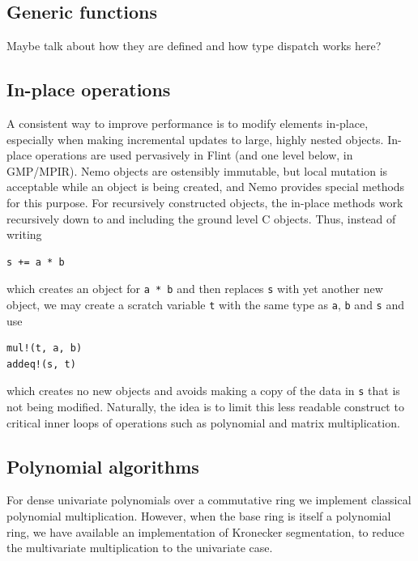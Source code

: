 \documentclass{sig-alternate-05-2015}
\begin{document}
\subsection{Generic functions}

Maybe talk about how they are defined and how type dispatch works here?

\subsection{In-place operations}

A consistent way to improve performance is to modify
elements in-place, especially when making incremental updates
to large, highly nested objects.
In-place operations are used pervasively in Flint (and one level below, in GMP/MPIR).
Nemo objects are ostensibly immutable, but local mutation is
acceptable while an object is being created,
and Nemo provides special methods for this purpose.
For recursively constructed objects, the in-place methods work
recursively down to and including the ground level C objects.
Thus, instead of writing
\begin{verbatim}
s += a * b
\end{verbatim}
which creates an object for \texttt{a * b}
and then replaces \texttt{s} with yet another new object, we may
create a scratch variable \texttt{t} with the same type as \texttt{a}, \texttt{b} and \texttt{s} and use
\begin{verbatim}
mul!(t, a, b)
addeq!(s, t)
\end{verbatim}
which creates no new objects and avoids making a copy of the data in \texttt{s}
that is not being modified.
Naturally, the idea is to limit this less readable construct to
critical inner loops of operations such as polynomial
and matrix multiplication.

\subsection{Polynomial algorithms}

For dense univariate polynomials over a commutative ring we implement classical
polynomial multiplication. However, when the base ring is itself a polynomial ring,
we have available an implementation of Kronecker segmentation, to reduce the
multivariate multiplication to the univariate case.
\end{document}
